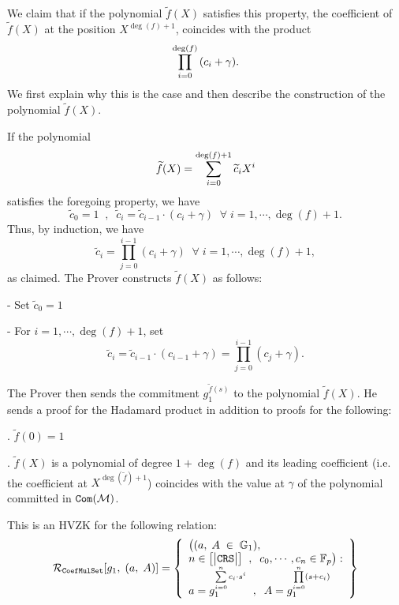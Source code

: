 \documentclass[11pt, lettersize, notitlepage, leqno, footskip=0.6cm]{article}
\newcommand{\bFp}{\mathbb{F}_p}
\newcommand{\wti}{\widetilde}
\newcommand{\mc}{\mathcal}
\newcommand{\mb}{\mathbb}
\newcommand{\vs}{\vspace{-0.15cm}}
\newcommand{\noin}{\noindent}
\numberwithin{equation}{section}
\begin{document}
We claim that if the polynomial $\wti{f}(X)$ satisfies this property, the coefficient of $\wti{f}(X)$ at the position $X^{\deg(f)+1}$,  coincides with the product \vs $$\prod\limits_{i=0}^{\deg(f)} {(c_i+\gamma)}. \vs $$ We first explain why this is the case and then describe the construction of the polynomial $\wti{f}(X)$. 

If the polynomial \vs $$\wti{f}(X) = \sum\limits_{i=0}^{\deg(f)+1} \wti{c}_i X^i \vs $$ satisfies the foregoing property, we have $$ \wti{c}_0 = 1\;\;,\;\;\wti{c}_i = \wti{c}_{i-1}\cdot (c_i+\gamma)\;\;\forall\;i= 1,\cdots,\deg(f)+1  .$$ Thus, by induction, we have \vspace{-2mm} $$ \wti{c}_i = \prod\limits_{j=0}^{i-1} {(c_i+\gamma)} \;\;\forall\; i = 1,\cdots, \deg(f)+1, $$ as claimed. The Prover constructs $\wti{f}(X)$ as follows: \vspace{2mm}

\noin - Set $\wti{c}_0 = 1$ \vspace{1mm}

\noin - For $i=1,\cdots,\deg(f)+1$, set \vs $$\wti{c}_i = \wti{c}_{i-1}\cdot (c_{i-1}+\gamma) =  \prod\limits_{j=0}^{i-1} (c_j+\gamma).  $$

\noin The Prover then sends the commitment $g_1^{\wti{f}(s)}$ to the polynomial $\wti{f}(X)$. He sends a proof for the Hadamard product in addition to proofs for the following: \vspace{2mm}

\noin 1. $\wti{f}(0) = 1$ \vspace{1mm}

\noin 2. $\wti{f}(X)$ is a polynomial of degree $1+\deg(f)$ and its leading coefficient (i.e. the coefficient at $X^{\deg(\wti{f})+1}$) coincides with the value at $\gamma$ of the polynomial committed in ${\tt{Com}}(\mc{M})$. 

\bigskip

This is an HVZK for the following relation: $$\mc{R}_{\tt{CoefMulSet}}[g_1,\;(a,\;A)] = \left\{\begin{array}{l} \big((a,\;  A\;\in\;\mb{G}_1),\\
n \in \big[\big|  {\tt{CRS}}  \big|\big]\;\;,\;\; c_0,\cdots,c_n\in\bFp\big):\\

a = g_1^{\sum\limits_{i=0}^n c_i\cdot s^i}\;\;,\;\;A = g_1^{\prod\limits_{i=0}^n (s+c_i)}

\end{array}\right\}  $$
\end{document}
